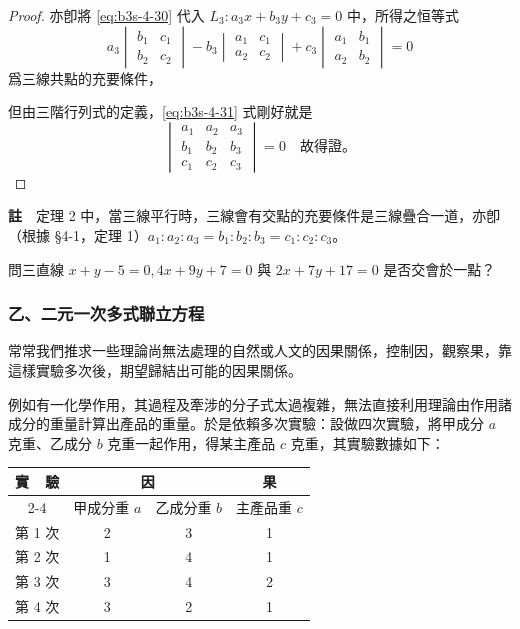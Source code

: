 \begin{proof}
亦卽將 \eqref{eq:b3s-4-30} 代入 $L_3 : a_3 x + b_3 y + c_3 = 0$ 中，所得之恒等式
\begin{equation}
a_3 \begin{vmatrix} b_1 & c_1 \\ b_2 & c_2 \end{vmatrix} - b_3 \begin{vmatrix} a_1 & c_1 \\ a_2 & c_2 \end{vmatrix} + c_3 \begin{vmatrix} a_1 & b_1 \\ a_2 & b_2 \end{vmatrix} = 0
\label{eq:b3s-4-31}
\end{equation}
爲三線共點的充要條件，

但由三階行列式的定義，\eqref{eq:b3s-4-31} 式剛好就是
\[
\begin{vmatrix}
a_1 & a_2 & a_3 \\
b_1 & b_2 & b_3 \\
c_1 & c_2 & c_3
\end{vmatrix} = 0 \quad \text{故得證。}
\]
\end{proof}

\noindent\textbf{註}~~定理 2 中，當三線平行時，三線會有交點的充要條件是三線疊合一道，亦卽（根據 \S 4-1，定理 1）$a_1 : a_2 : a_3 = b_1 : b_2 : b_3 = c_1 : c_2 : c_3$。

\begin{exercise}[作業 22]
問三直線 $x + y - 5 = 0, 4x + 9y + 7 = 0$ 與 $2x + 7y + 17 = 0$ 是否交會於一點？
\end{exercise}

\subsubsection*{乙、二元一次多式聯立方程}

常常我們推求一些理論尚無法處理的自然或人文的因果關係，控制因，觀察果，靠這樣實驗多次後，期望歸結出可能的因果關係。

例如有一化學作用，其過程及牽涉的分子式太過複雜，無法直接利用理論由作用諸成分的重量計算出產品的重量。於是依賴多次實驗：設做四次實驗，將甲成分 $a$ 克重、乙成分 $b$ 克重一起作用，得某主產品 $c$ 克重，其實驗數據如下：

\begin{table}[H]
\centering
\begin{tabular}{|c|c|c|c|}
\hline
\multirow{2}{*}{實~~驗} & \multicolumn{2}{c|}{因} & 果 \\
\cline{2-4}
 & 甲成分重 $a$ & 乙成分重 $b$ & 主產品重 $c$ \\
\hline
第 1 次 & 2 & 3 & 1 \\
第 2 次 & 1 & 4 & 1 \\
第 3 次 & 3 & 4 & 2 \\
第 4 次 & 3 & 2 & 1 \\
\hline
\end{tabular}
\end{table}

